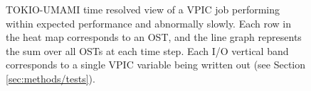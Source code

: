 \begin{figure}[t]
	\centering
	\caption{TOKIO-UMAMI time resolved view of a VPIC job performing  within expected performance and  abnormally slowly.  Each row in the heat map corresponds to an OST, and the line graph represents the sum over all OSTs at each time step.  Each I/O vertical band corresponds to a single VPIC variable being written out (see Section \ref{sec:methods/tests}).}
	\label{fig:umami-deepdive}
\end{figure}


